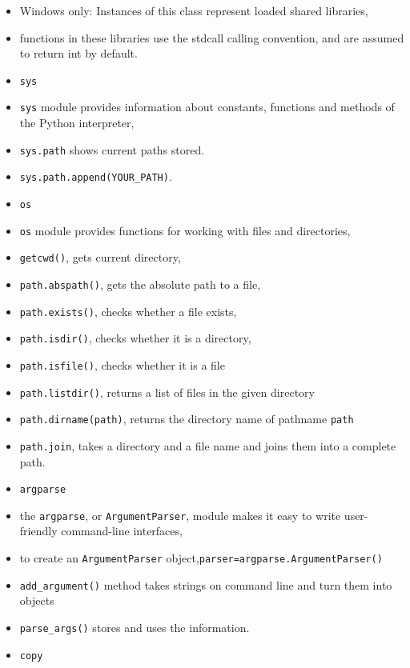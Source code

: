 \documentclass[onecolumn]{IEEEtran} %
\begin{document}
\begin{itemize}
        \bi
            \item Windows only: Instances of this class represent loaded shared libraries,
            \item functions in these libraries use the stdcall calling convention, and are assumed to return int by default.
        \ei
    \ei
    \item \verb|sys|
    \bi
        \item \verb|sys| module provides information about constants, functions and methods of the Python interpreter,
        \item \verb|sys.path| shows current paths stored.
        \item \verb|sys.path.append(YOUR_PATH)|.
    \ei
    \item \verb|os|
    \bi
        \item \verb|os| module provides functions for working with files and directories,
        \item \verb|getcwd()|, gets current directory,
        \item \verb|path.abspath()|, gets the absolute path to a file,
        \item \verb|path.exists()|, checks whether a file exists,
        \item \verb|path.isdir()|, checks whether it is a directory,
        \item \verb|path.isfile()|, checks whether it is a file
        \item \verb|path.listdir()|, returns a list of files in the given directory
        \item \verb|path.dirname(path)|, returns the directory name of pathname \verb|path|
        \item \verb|path.join|, takes a directory and a file name and joins them into a complete path.
    \ei
    \item \verb|argparse|
    \bi
        \item the \verb|argparse|, or \verb|ArgumentParser|, module makes it easy to write user-friendly command-line interfaces,
        \item to create an \verb|ArgumentParser| object,\newline \verb|parser=argparse.ArgumentParser()|
        \item \verb|add_argument()| method takes strings on command line and turn them into objects
        \item \verb|parse_args()| stores and uses the information.
    \ei
    \item \verb|copy|

\end{itemize}
\end{document}
